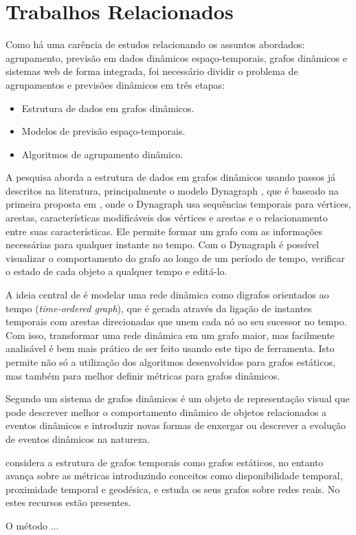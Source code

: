 \section{Trabalhos Relacionados}
 \label{chap:trabalhos-relacionados} 
Como há uma carência de estudos relacionando os assuntos abordados: agrupamento, previsão em dados dinâmicos espaço-temporais, grafos dinâmicos e sistemas web de forma integrada, foi necessário dividir o problema de agrupamentos e previsões dinâmicos em três etapas:
\begin{itemize}
\item Estrutura de dados em grafos dinâmicos.
\item Modelos de previsão espaço-temporais.
\item Algoritmos de agrupamento dinâmico.
\end{itemize}

A pesquisa aborda a estrutura de dados em grafos dinâmicos usando passos já descritos na literatura, principalmente o modelo Dynagraph \cite{dynagraph}, que é baseado na primeira proposta em \cite{dynagraph2012}, onde o Dynagraph usa sequências temporais para vértices, arestas, características modificáveis dos vértices e arestas e o relacionamento entre suas características. Ele permite formar um grafo com as informações necessárias para qualquer instante no tempo. Com o Dynagraph é possível visualizar o comportamento do grafo ao longo de um período de tempo, verificar o estado de cada objeto a qualquer tempo e editá-lo.

A ideia central de \cite{kim} é modelar uma rede dinâmica como digrafos orientados ao tempo (\textit{time-ordered graph}), que é gerada através da ligação de instantes temporais com arestas direcionadas que unem cada nó ao seu sucessor no tempo. Com isso, transformar uma rede dinâmica em um grafo maior, mas facilmente analisável é bem mais prático de ser feito usando este tipo de ferramenta. Isto permite não só a utilização dos algoritmos 
desenvolvidos para grafos estáticos, mas também para melhor definir métricas para grafos dinâmicos. 

Segundo \cite{kim} um sistema de grafos dinâmicos é um objeto de representação visual que pode descrever melhor o comportamento dinâmico de objetos relacionados a eventos dinâmicos e introduzir novas formas de enxergar ou descrever a evolução de eventos dinâmicos na natureza.

\cite{kostakos} considera a estrutura de grafos temporais como grafos
estáticos, no entanto avança sobre as métricas introduzindo conceitos como disponibilidade temporal, proximidade temporal e geodésica, e estuda os seus grafos sobre redes reais. No \cite{dynagraph} estes recursos estão presentes.

O método ...\cite{ign}
